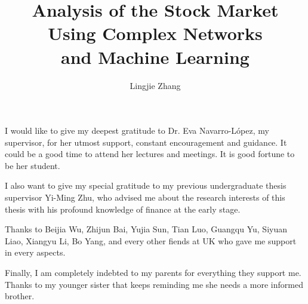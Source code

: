 \documentclass[12pt,MSc,wordcount,twoside]{muthesis}
\begin{document}

\title{Analysis of the Stock Market\\
  Using Complex Networks\\
  and Machine Learning}
\author{Lingjie Zhang}

\beforeabstract



\afterabstract

I would like to give my deepest gratitude to Dr. Eva Navarro-López, my supervisor, for her utmost support, constant encouragement and guidance. It could be a good time to attend her lectures and meetings. It is good fortune to be her student.

I also want to give my special gratitude to my previous undergraduate thesis supervisor Yi-Ming Zhu, who advised me about the research interests of this thesis with his profound knowledge of finance at the early stage.

Thanks to Beijia Wu, Zhijun Bai, Yujia Sun, Tian Luo, Guangqu Yu, Siyuan Liao, Xiangyu Li, Bo Yang, and every other fiends at UK who gave me support in every aspects.

Finally, I am completely indebted to my parents for everything they support me. Thanks to my younger sister that keeps reminding me she needs a more informed brother.

\afterpreface

\tableofcontents











% 





\appendix

\end{document}
